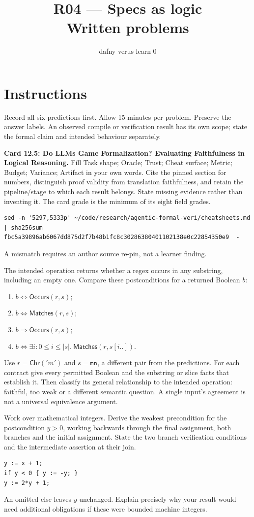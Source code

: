 \documentclass[11pt]{article}
\title{R04 --- Specs as logic \\ \large Written problems}
\author{dafny-verus-learn-0}
\date{}
\begin{document}
\maketitle
\section*{Instructions}
Record all six predictions first. Allow 15 minutes per problem. Preserve the
answer labels. An observed compile or verification result has its own scope;
state the formal claim and intended behaviour separately.
\begin{problem}\label{prob:B1}
\textbf{Card 12.5: Do LLMs Game Formalization? Evaluating Faithfulness in
Logical Reasoning.} Fill Task shape; Oracle; Trust; Cheat surface; Metric;
Budget; Variance; Artifact in your own words. Cite the pinned section for
numbers, distinguish proof validity from translation faithfulness, and retain
the pipeline/stage to which each result belongs. State missing evidence rather
than inventing it. The card grade is the minimum of its eight field grades.
\begin{verbatim}
sed -n '5297,5333p' ~/code/research/agentic-formal-veri/cheatsheets.md | sha256sum
fbc5a39896ab6067dd875d2f7b48b1fc8c30286380401102138e0c22854350e9  -
\end{verbatim}
A mismatch requires an author source re-pin, not a learner finding.
\end{problem}
\begin{problem}[proof]\label{prob:B2}
The intended operation returns whether a regex occurs in any substring,
including an empty one. Compare these postconditions for a returned Boolean $b$:
\begin{enumerate}
\item $b\Leftrightarrow\mathsf{Occurs}(r,s)$;
\item $b\Leftrightarrow\mathsf{Matches}(r,s)$;
\item $b\Rightarrow\mathsf{Occurs}(r,s)$;
\item $b\Leftrightarrow\exists i:0\leq i\leq |s|.\ \mathsf{Matches}(r,s[i..])$.
\end{enumerate}
Use $r=\mathsf{Chr}('m')$ and $s=\texttt{mn}$, a different pair from the
predictions. For each contract give every permitted Boolean and the substring
or slice facts that establish it. Then classify its general relationship to
the intended operation: faithful, too weak or a different semantic question.
A single input's agreement is not a universal equivalence argument.
\end{problem}
\begin{problem}[proof]\label{prob:B3}
Work over mathematical integers. Derive the weakest precondition for the
postcondition $y>0$, working backwards through the final assignment, both
branches and the initial assignment. State the two branch verification
conditions and the intermediate assertion at their join.
\begin{verbatim}
y := x + 1;
if y < 0 { y := -y; }
y := 2*y + 1;
\end{verbatim}
An omitted else leaves $y$ unchanged. Explain precisely why your result would
need additional obligations if these were bounded machine integers.
\end{problem}
\end{document}
